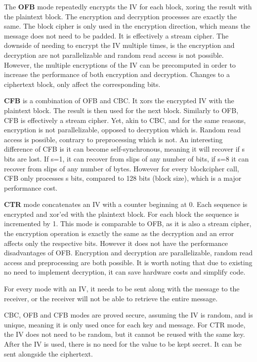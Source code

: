 The \textbf{\ac{OFB}} mode repeatedly encrypts the IV for each block, xoring the result with the plaintext block.
The encryption and decryption processes are exactly the same.
The block cipher is only used in the encryption direction, which means the message does not need to be padded. It is effectively a stream cipher.
The downside of needing to encrypt the IV multiple times, is the encryption and decryption are not parallelizable and random read access is not possible. However, the multiple encryptions of the IV can be precomputed in order to increase the performance of both encryption and decryption.
Changes to a ciphertext block, only affect the corresponding bits.

\textbf{\ac{CFB}} is a combination of \ac{OFB} and \ac{CBC}. It xors the encrypted \ac{IV} with the plaintext block. The result is then used for the next block.
Similarly to \ac{OFB}, \ac{CFB} is effectively a stream cipher. Yet, akin to \ac{CBC}, and for the same reasons, encryption is not parallelizable, opposed to decryption which is. Random read access is possible, contrary to preprocessing which is not.
An interesting difference of \ac{CFB} is it can become self-synchronous, meaning it will recover if s bits are lost. If s=1, it can recover from slips of any number of bits, if s=8 it can recover from slips of any number of bytes. However for every blockcipher call, \ac{CFB} only processes s bits, compared to 128 bits (block size), which is a major performance cost.

\textbf{\ac{CTR}} mode concatenates an IV with a counter beginning at 0. Each sequence is encrypted and xor'ed with the plaintext block. For each block the sequence is incremented by 1.
This mode is comparable to \ac{OFB}, as it is also a stream cipher, the encryption operation is exactly the same as the decryption and an error affects only the respective bits.
However it does not have the performance disadvantages of \ac{OFB}. Encryption and decryption are parallelizable, random read access and preprocessing are both possible.
It is worth noting that due to existing no need to implement decryption, it can save hardware costs and simplify code.

For every mode with an \ac{IV}, it needs to be sent along with the message to the receiver, or the receiver will not be able to retrieve the entire message.

\ac{CBC}, \ac{OFB} and \ac{CFB} modes are proved secure, assuming the \ac{IV} is random, and is unique, meaning it is only used once for each key and message. For \ac{CTR} mode, the IV does not need to be random, but it cannot be reused with the same key.
After the \ac{IV} is used, there is no need for the value to be kept secret. It can be sent alongside the ciphertext.

